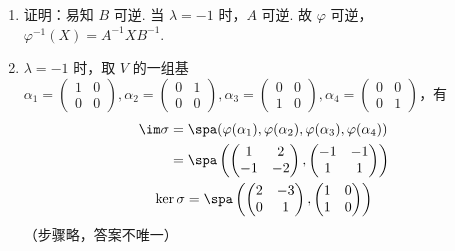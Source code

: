 \begin{exercise}
\begin{exgroup}
\begin{answer}
\begin{enumerate}
                \item 证明：易知 $ B $ 可逆. 当 $ \lambda = -1 $ 时，$ A $ 可逆. 故 $ \varphi $ 可逆，$ \varphi^{-1}(X) = A^{-1} X B^{-1} $.

                \item $ \lambda = -1 $ 时，取 $ V $ 的一组基 $ \alpha_1 = \begin{pmatrix} 1 & 0 \\ 0 & 0 \end{pmatrix}, \alpha_2 = \begin{pmatrix} 0 & 1 \\ 0 & 0 \end{pmatrix}, \alpha_3 = \begin{pmatrix} 0 & 0 \\ 1 & 0 \end{pmatrix}, \alpha_4 = \begin{pmatrix} 0 & 0 \\ 0 & 1 \end{pmatrix} $，有
                      \begin{gather*}
                          \begin{aligned}
                              \im \sigma & = \spa(\varphi(\alpha_1), \varphi(\alpha_2), \varphi(\alpha_3), \varphi(\alpha_4))                                \\
                                         & = \spa\left(\begin{pmatrix} 1 & 2 \\ -1 & -2 \end{pmatrix}, \begin{pmatrix} -1 & -1 \\ 1 & 1 \end{pmatrix}\right)
                          \end{aligned} \\
                          \ker \sigma = \spa\left(\begin{pmatrix} 2 & -3 \\ 0 & 1 \end{pmatrix}, \begin{pmatrix} 1 & 0 \\ 1 & 0 \end{pmatrix}\right)
                      \end{gather*}
                      （步骤略，答案不唯一）


\end{enumerate}
\end{answer}
\end{exgroup}
\end{exercise}
